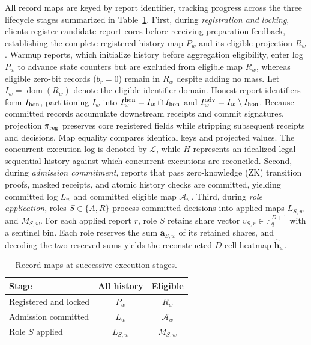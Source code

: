 \documentclass[conference,compsoc]{IEEEtran}
\theoremstyle{definition}
\numberwithin{equation}{section}
\numberwithin{table}{section}
\numberwithin{figure}{section}
\theoremstyle{plain}
\begin{document}
All record maps are keyed by report identifier, tracking progress across the three lifecycle stages summarized in Table~\ref{tab:record-types}.
First, during \emph{registration and locking}, clients register candidate report cores before receiving preparation feedback, establishing the complete registered history map \(P_w\) and its eligible projection \(R_w\). Warmup reports, which initialize history before aggregation eligibility, enter log \(P_w\) to advance state counters but are excluded from eligible map \(R_w\), whereas eligible zero-bit records (\(b_r=0\)) remain in \(R_w\) despite adding no mass. Let \(I_w=\operatorname{dom}(R_w)\) denote the eligible identifier domain. Honest report identifiers form \(I_{\rm hon}\), partitioning \(I_w\) into \(I_w^{\rm hon}=I_w\cap I_{\rm hon}\) and \(I_w^{\rm adv}=I_w\setminus I_{\rm hon}\). Because committed records accumulate downstream receipts and commit signatures, projection \(\pi_{\rm reg}\) preserves core registered fields while stripping subsequent receipts and decisions. Map equality compares identical keys and projected values. The concurrent execution log is denoted by \(\mathcal L\), while \(H\) represents an idealized legal sequential history against which concurrent executions are reconciled.
Second, during \emph{admission commitment}, reports that pass zero-knowledge (ZK) transition proofs, masked receipts, and atomic history checks are committed, yielding committed log \(L_w\) and committed eligible map \(\mathcal A_w\).
Third, during \emph{role application}, roles \(S\in\{A,R\}\) process committed decisions into applied maps \(L_{S,w}\) and \(M_{S,w}\). For each applied report \(r\), role \(S\) retains share vector \(v_{S,r}\in\mathbb F_q^{D+1}\) with a sentinel bin. Each role reserves the sum \(\mathbf a_{S,w}\) of its retained shares, and decoding the two reserved sums yields the reconstructed \(D\)-cell heatmap \(\hat{\mathbf h}_w\).

\begin{table}[t]
\centering
\caption{Record maps at successive execution stages.}
\label{tab:record-types}
\footnotesize
\renewcommand{\arraystretch}{1.08}
\begin{tabular*}{\columnwidth}{@{\extracolsep{\fill}}lcc@{}}
\toprule
\textbf{Stage} & \textbf{All history} & \textbf{Eligible} \\
\midrule
Registered and locked & \(P_w\) & \(R_w\) \\
Admission committed & \(L_w\) & \(\mathcal A_w\) \\
Role \(S\) applied & \(L_{S,w}\) & \(M_{S,w}\) \\
\bottomrule
\end{tabular*}
\end{table}
\end{document}
